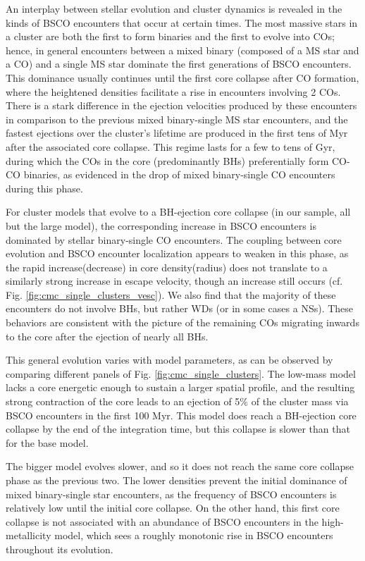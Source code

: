 \documentclass[twocolumn]{aastex631}
\begin{document}
An interplay between stellar evolution and cluster dynamics is revealed in the kinds of BSCO encounters that occur at certain times.
The most massive stars in a cluster are both the first to form binaries and the first to evolve into COs; hence, in general encounters between a mixed binary (composed of a MS star and a CO) and a single MS star dominate the first generations of BSCO encounters.
This dominance usually continues until the first core collapse after CO formation, where the heightened densities facilitate a rise in encounters involving 2 COs.
There is a stark difference in the ejection velocities produced by these encounters in comparison to the previous mixed binary-single MS star encounters, and the fastest ejections over the cluster's lifetime are produced in the first tens of Myr after the associated core collapse.
This regime lasts for a few to tens of Gyr, during which the COs in the core (predominantly BHs) preferentially form CO-CO binaries, as evidenced in the drop of mixed binary-single CO encounters during this phase.

For cluster models that evolve to a BH-ejection core collapse (in our sample, all but the large model), the corresponding increase in BSCO encounters is dominated by stellar binary-single CO encounters.
The coupling between core evolution and BSCO encounter localization appears to weaken in this phase, as the rapid increase(decrease) in core density(radius) does not translate to a similarly strong increase in escape velocity, though an increase still occurs (cf. Fig. \ref{fig:cmc_single_clusters_vesc}).
We also find that the majority of these encounters do not involve BHs, but rather WDs (or in some cases a NSs).
These behaviors are consistent with the picture of the remaining COs migrating inwards to the core after the ejection of nearly all BHs.

This general evolution varies with model parameters, as can be observed by comparing different panels of Fig. \ref{fig:cmc_single_clusters}.
The low-mass model lacks a core energetic enough to sustain a larger spatial profile, and the resulting strong contraction of the core leads to an ejection of 5\% of the cluster mass via BSCO encounters in the first 100 Myr.
This model does reach a BH-ejection core collapse by the end of the integration time, but this collapse is slower than that for the base model.

The bigger model evolves slower, and so it does not reach the same core collapse phase as the previous two.
The lower densities prevent the initial dominance of mixed binary-single star encounters, as the frequency of BSCO encounters is relatively low until the initial core collapse.
On the other hand, this first core collapse is not associated with an abundance of BSCO encounters in the high-metallicity model, which sees a roughly monotonic rise in BSCO encounters throughout its evolution.
\end{document}
